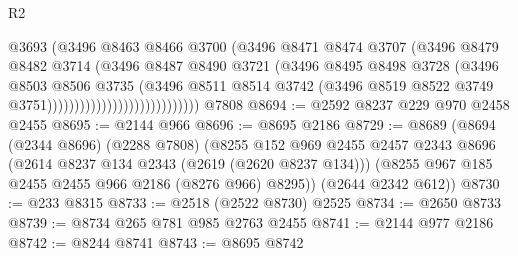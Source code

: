 \begin{lexlean}{R2}
\begin{coremodule}
                                            @3693
                                            (@3496
                                              @8463
                                              @8466
                                              @3700
                                              (@3496
                                                @8471
                                                @8474
                                                @3707
                                                (@3496
                                                  @8479
                                                  @8482
                                                  @3714
                                                  (@3496
                                                    @8487
                                                    @8490
                                                    @3721
                                                    (@3496
                                                      @8495
                                                      @8498
                                                      @3728
                                                      (@3496
                                                        @8503
                                                        @8506
                                                        @3735
                                                        (@3496
                                                          @8511
                                                          @8514
                                                          @3742
                                                          (@3496
                                                            @8519
                                                            @8522
                                                            @3749
                                                            @3751))))))))))))))))))))))))))))
    @7808
@8694 := @2592 @8237 @229 @970 @2458 @2455
@8695 := @2144 @966
@8696 := @8695 @2186
@8729 := @8689
    (@8694
      (@2344 @8696)
      (@2288 @7808)
      (@8255
        @152
        @969
        @2455
        @2457
        @2343
        @8696
        (@2614 @8237 @134 @2343 (@2619 (@2620 @8237 @134)))
        (@8255 @967 @185 @2455 @2455 @966 @2186 (@8276 @966) @8295))
      (@2644 @2342 @612))
@8730 := @233 @8315
@8733 := @2518 (@2522 @8730) @2525
@8734 := @2650 @8733
@8739 := @8734 @265 @781 @985 @2763 @2455
@8741 := @2144 @977 @2186
@8742 := @8244 @8741
@8743 := @8695 @8742

\end{coremodule}
\end{lexlean}
